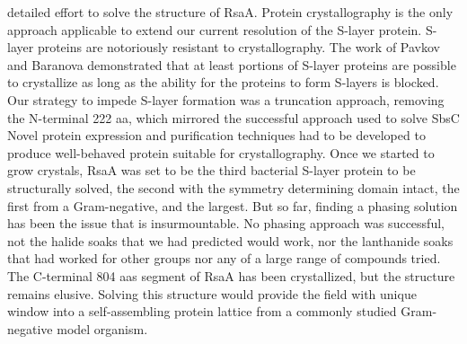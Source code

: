  detailed effort to solve the structure of RsaA. Protein crystallography is the only approach applicable to extend our current resolution of the \caulobacter{} \ac{S-layer} protein. \Ac{S-layer} proteins are notoriously resistant to crystallography. The work of Pavkov \etal{} and Baranova \etal{} demonstrated that at least portions of \ac{S-layer} proteins are possible to crystallize as long as the ability for the proteins to form \acp{S-layer} is blocked. Our strategy to impede \ac{S-layer} formation was a truncation approach, removing the N-terminal 222 \ac{aa}, which mirrored the successful approach used to solve SbsC Novel protein expression and purification techniques had to be developed to produce well-behaved protein suitable for crystallography. Once we started to grow crystals, RsaA was set to be the third bacterial \ac{S-layer} protein to be structurally solved, the second with the symmetry determining domain intact, the first from a Gram-negative, and the largest. But so far, finding a phasing solution has been the issue that is insurmountable. No phasing approach was successful, not the halide soaks that we had predicted would work, nor the lanthanide soaks that had worked for other groups nor any of a large range of  compounds tried. The C-terminal 804 \acp{aa} segment of RsaA has been crystallized, but the structure remains elusive. Solving this structure would provide the field with unique window into a self-assembling protein lattice from a commonly studied Gram-negative model organism. 

